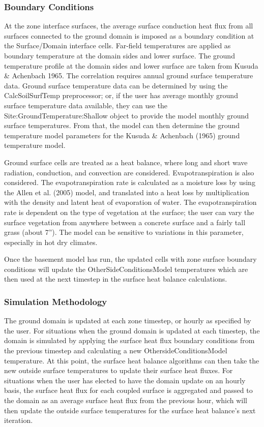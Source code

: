 \subsubsection{Boundary Conditions}\label{boundary-conditions}

At the zone interface surfaces, the average surface conduction heat flux from all surfaces connected to the ground domain is imposed as a boundary condition at the Surface/Domain interface cells. Far-field temperatures are applied as boundary temperature at the domain sides and lower surface. The ground temperature profile at the domain sides and lower surface are taken from Kusuda \& Achenbach 1965. The correlation requires annual ground surface temperature data. Ground surface temperature data can be determined by using the CalcSoilSurfTemp preprocessor; or, if the user has average monthly ground surface temperature data available, they can use the Site:GroundTemperature:Shallow object to provide the model monthly ground surface temperatures. From that, the model can then determine the ground temperature model parameters for the Kusuda \& Achenbach (1965) ground temperature model.

Ground surface cells are treated as a heat balance, where long and short wave radiation, conduction, and convection are considered. Evapotranspiration is also considered. The evapotranspiration rate is calculated as a moisture loss by using the Allen et al. (2005) model, and translated into a heat loss by multiplication with the density and latent heat of evaporation of water. The evapotranspiration rate is dependent on the type of vegetation at the surface; the user can vary the surface vegetation from anywhere between a concrete surface and a fairly tall grass (about 7''). The model can be sensitive to variations in this parameter, especially in hot dry climates.

Once the basement model has run, the updated cells with zone surface boundary conditions will update the OtherSideConditionsModel temperatures which are then used at the next timestep in the surface heat balance calculations.

\subsubsection{Simulation Methodology}\label{simulation-methodology}

The ground domain is updated at each zone timestep, or hourly as specified by the user. For situations when the ground domain is updated at each timestep, the domain is simulated by applying the surface heat flux boundary conditions from the previous timestep and calculating a new OthersideConditionsModel temperature. At this point, the surface heat balance algorithms can then take the new outside surface temperatures to update their surface heat fluxes. For situations when the user has elected to have the domain update on an hourly basis, the surface heat flux for each coupled surface is aggregated and passed to the domain as an average surface heat flux from the previous hour, which will then update the outside surface temperatures for the surface heat balance's next iteration.

